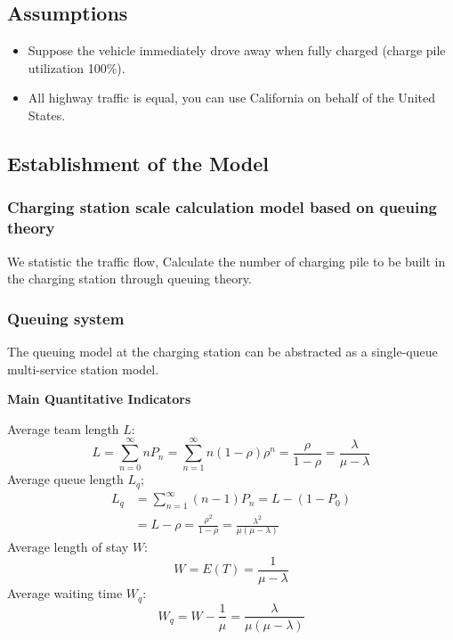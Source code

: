 \documentclass{mcmthesis}
\begin{document}
\subsection{Assumptions}
\begin{itemize}
	\item Suppose the vehicle immediately drove away when fully charged  (charge pile utilization 100\%).
	\item All highway traffic is equal, you can use California on behalf of the United States.
\end{itemize}

\subsection{Establishment of the Model}

\subsubsection{Charging station scale calculation model based on queuing theory}

\par We statistic the traffic flow, Calculate the number of charging pile to be built in the charging station through queuing theory. 


\subsubsection*{Queuing system}
\par The queuing model at the charging station can be abstracted as a single-queue multi-service station model.

\textbf{Main Quantitative Indicators}

\par Average team length $L$:
\begin{equation}
			L = \sum \limits_{n = 0}^\infty n P_n = \sum \limits_{n = 1}^\infty n (1 - \rho) \rho^n 
	 	  = \frac{\rho}{1-\rho} = \frac{\lambda}{\mu - \lambda}
\end{equation}
Average queue length $L_q$;
\begin{equation}
\begin{split}
	L_q & = \sum \limits_{n=1}^\infty (n-1)P_n = L - (1 - P_0) \\
	& = L - \rho = \frac{\rho^2}{1-\rho} = \frac{\lambda^2}{\mu(\mu - \lambda)}
\end{split}
\end{equation}
Average length of stay $W$:
\begin{equation}
	W = E(T) = \frac{1}{\mu - \lambda}
\end{equation}
Average waiting time $W_q$:
\begin{equation}
	W_q = W - \frac{1}{\mu} = \frac{\lambda}{\mu(\mu - \lambda)}
\end{equation}
\end{document}
